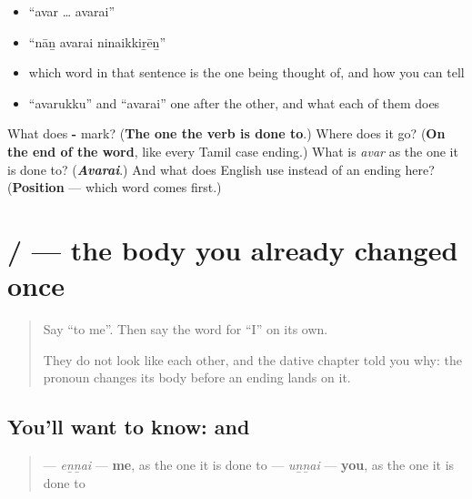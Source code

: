 \begin{itemize}
\raggedright
  \item \textquotedblleft{}avar … avarai\textquotedblright{}
  \item \textquotedblleft{}nāṉ avarai ninaikkiṟēṉ\textquotedblright{}
  \item which word in that sentence is the one being thought of, and how you can tell
  \item \textquotedblleft{}avarukku\textquotedblright{} and \textquotedblleft{}avarai\textquotedblright{} one after the other, and what each of them does
\end{itemize}

\begin{tcolorbox}[breakable,colback=teal!4,colframe=teal!35!black,title={Before you move on}]
What does \textbf{-} mark? (\textbf{The one the verb is done to}.) Where does it go? (\textbf{On the end of the word}, like every Tamil case ending.) What is \emph{avar} as the one it is done to? (\emph{\textbf{Avarai}}.) And what does English use instead of an ending here? (\textbf{Position} — which word comes first.)
\end{tcolorbox}
\section[\texorpdfstring{\ta{என்னை} / \ta{உன்னை} (eṉṉai / uṉṉai)}{என்னை / உன்னை (eṉṉai / uṉṉai)}]{ /  — the body you already changed once}

\label{lesson:TA-C86-ennai-unnai}



\begin{quote}
Say \textquotedblleft{}to me\textquotedblright{}. Then say the word for \textquotedblleft{}I\textquotedblright{} on its own.

They do not look like each other, and the dative chapter told you why: the pronoun changes its body before an ending lands on it.
\end{quote}

\subsection*{You'll want to know:  and }
\begin{quote}
\textbf{} — \emph{eṉṉai} — \textbf{me}, as the one it is done to \textbf{} — \emph{uṉṉai} — \textbf{you}, as the one it is done to
\end{quote}


